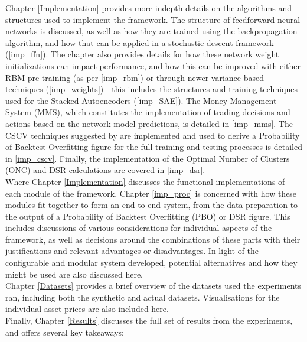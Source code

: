 \documentclass[a4paper,11pt,oneside]{article}
\theoremstyle{plain}
\theoremstyle{definition}
\begin{document}
	Chapter \ref{Implementation} provides more indepth details on the algorithms and structures used to implement the framework. The structure of feedforward neural networks is discussed, as well as how they are trained using the backpropagation algorithm, and how that can be applied in a stochastic descent framework (\ref{imp_ffn}). The chapter also provides details for how these network weight initializations can impact performance, and how this can be improved with either RBM pre-training (as per \ref{imp_rbm}) or through newer variance based techniques (\ref{imp_weights}) - this includes the structures and training techniques used for the Stacked Autoencoders (\ref{imp_SAE}). The Money Management System (MMS), which constitutes the implementation of trading decisions and actions based on the network model predictions, is detailed in \ref{imp_mms}. The CSCV techniques suggested by \cite{BailyPBO} are implemented and used to derive a Probability of Backtest Overfitting figure for the full training and testing processes is detailed in \ref{imp_cscv}. Finally, the implementation of the Optimal Number of Clusters (ONC) and DSR calculations are covered in \ref{imp_dsr}.
	~\\\newline
	Where Chapter \ref{Implementation} discusses the functional implementations of each module of the framework, Chapter \ref{imp_proc} is concerned with how these modules fit together to form an end to end system, from the data preparation to the output of a Probability of Backtest Overfitting (PBO) or DSR figure. This includes discussions of various considerations for individual aspects of the framework, as well as decisions around the combinations of these parts with their justifications and relevant advantages or disadvantages. In light of the configurable and modular system developed, potential alternatives and how they might be used are also discussed here.
	~\\\newline
	Chapter \ref{Datasets} provides a brief overview of the datasets used the experiments ran, including both the synthetic and actual datasets. Visualisations for the individual asset prices are also included here.
	~\\\newline
	Finally, Chapter \ref{Results} discusses the full set of results from the experiments, and offers several key takeaways:
\end{document}
